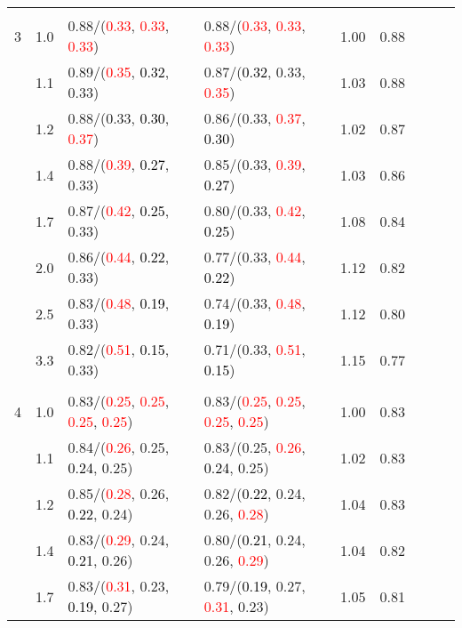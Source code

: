 \documentclass[10pt,a4paper]{report}
\begin{document}
\begin{table}[!htbp]
\begin{center}
{\begin{tabular}{ccllccccc}
			&&&&\\
			3			&1.0&0.88/(\textcolor{red}{0.33}, \textcolor{red}{0.33}, \textcolor{red}{0.33})&0.88/(\textcolor{red}{0.33}, \textcolor{red}{0.33}, \textcolor{red}{0.33})&1.00&0.88\\
			&1.1&0.89/(\textcolor{red}{0.35}, \textcolor{black}{0.32}, 0.33)&0.87/(\textcolor{black}{0.32}, 0.33, \textcolor{red}{0.35})&1.03&0.88\\
			&1.2&0.88/(0.33, \textcolor{black}{0.30}, \textcolor{red}{0.37})&0.86/(0.33, \textcolor{red}{0.37}, \textcolor{black}{0.30})&1.02&0.87\\
			&1.4&0.88/(\textcolor{red}{0.39}, \textcolor{black}{0.27}, 0.33)&0.85/(0.33, \textcolor{red}{0.39}, \textcolor{black}{0.27})&1.03&0.86\\
			&1.7&0.87/(\textcolor{red}{0.42}, \textcolor{black}{0.25}, 0.33)&0.80/(0.33, \textcolor{red}{0.42}, \textcolor{black}{0.25})&1.08&0.84\\
			&2.0&0.86/(\textcolor{red}{0.44}, \textcolor{black}{0.22}, 0.33)&0.77/(0.33, \textcolor{red}{0.44}, \textcolor{black}{0.22})&1.12&0.82\\
			&2.5&0.83/(\textcolor{red}{0.48}, \textcolor{black}{0.19}, 0.33)&0.74/(0.33, \textcolor{red}{0.48}, \textcolor{black}{0.19})&1.12&0.80\\
			&3.3&0.82/(\textcolor{red}{0.51}, \textcolor{black}{0.15}, 0.33)&0.71/(0.33, \textcolor{red}{0.51}, \textcolor{black}{0.15})&1.15&0.77\\
			&&&&\\
			4			&1.0&0.83/(\textcolor{red}{0.25}, \textcolor{red}{0.25}, \textcolor{red}{0.25}, \textcolor{red}{0.25})&0.83/(\textcolor{red}{0.25}, \textcolor{red}{0.25}, \textcolor{red}{0.25}, \textcolor{red}{0.25})&1.00&0.83\\
			&1.1&0.84/(\textcolor{red}{0.26}, 0.25, \textcolor{black}{0.24}, 0.25)&0.83/(0.25, \textcolor{red}{0.26}, \textcolor{black}{0.24}, 0.25)&1.02&0.83\\
			&1.2&0.85/(\textcolor{red}{0.28}, 0.26, \textcolor{black}{0.22}, 0.24)&0.82/(\textcolor{black}{0.22}, 0.24, 0.26, \textcolor{red}{0.28})&1.04&0.83\\
			&1.4&0.83/(\textcolor{red}{0.29}, 0.24, \textcolor{black}{0.21}, 0.26)&0.80/(\textcolor{black}{0.21}, 0.24, 0.26, \textcolor{red}{0.29})&1.04&0.82\\
			&1.7&0.83/(\textcolor{red}{0.31}, 0.23, \textcolor{black}{0.19}, 0.27)&0.79/(\textcolor{black}{0.19}, 0.27, \textcolor{red}{0.31}, 0.23)&1.05&0.81\\

\end{tabular}}
\end{center}
\end{table}
\end{document}

